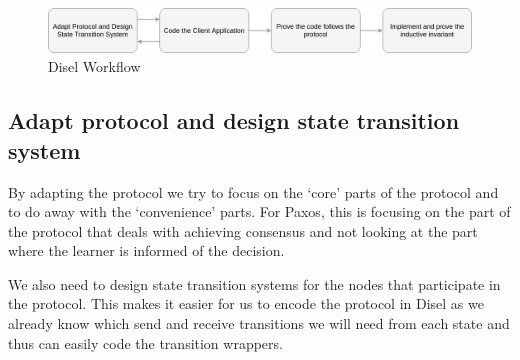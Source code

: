 \begin{figure}
\centering
\includegraphics[width=\textwidth]{figures/disel_workflow.png}
\caption{Disel Workflow
\label{fig:myInlineFigure}}
\end{figure}

%
%
%
%
%
%
%
%
%

\subsection{Adapt protocol and design state transition system}
By adapting the protocol we try to focus on the `core' parts of the protocol
and to do away with the `convenience' parts. For Paxos, this is focusing on the
part of the protocol that deals with achieving consensus and not looking at the
part where the learner is informed of the decision.

We also need to design state transition systems for the nodes that participate
in the protocol. This makes it easier for us to encode the protocol in Disel as
we already know which send and receive transitions we will need from each state
and thus can easily code the transition wrappers.

